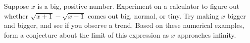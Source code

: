 Suppose $x$ is a big, positive number. Experiment on a calculator to figure
out whether $\sqrt{x+1}-\sqrt{x-1}$ comes out big, normal, or tiny.
Try making $x$ bigger and bigger, and see if you observe a trend.
Based on these numerical examples, form a conjecture about the
limit of this expression as $x$ approaches infinity.
